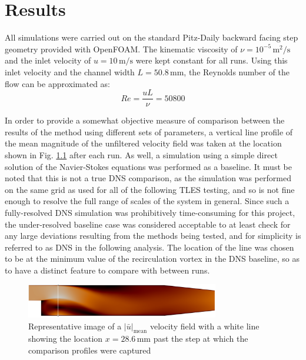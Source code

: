 \chapter{Results}


All simulations were carried out on the standard Pitz-Daily backward facing step geometry provided with OpenFOAM. The kinematic viscosity of $\nu=10^{-5}\,\mathrm{m}^2/\mathrm{s}$ and the inlet velocity of $u=10\,\mathrm{m}/\mathrm{s}$ were kept constant for all runs. Using this inlet velocity and the channel width $L=50.8\,\mathrm{mm}$, the Reynolds number of the flow can be approximated as: $$ Re=\frac{uL}{\nu}=50800$$

In order to provide a somewhat objective measure of comparison between the results of the method using different sets of parameters, a vertical line profile of the mean magnitude of the unfiltered velocity field was taken at the location shown in Fig. \ref{fig:line_location} after each run. As well, a simulation using a simple direct solution of the Navier-Stokes equations was performed as a baseline. It must be noted that this is not a true DNS comparison, as the simulation was performed on the same grid as used for all of the following TLES testing, and so is not fine enough to resolve the full range of scales of the system in general. Since such a fully-resolved DNS simulation was prohibitively time-consuming for this project, the under-resolved baseline case was considered acceptable to at least check for any large deviations resulting from the methods being tested, and for simplicity is referred to as DNS in the following analysis. The location of the line was chosen to be at the minimum value of the recirculation vortex in the DNS baseline, so as to have a distinct feature to compare with between runs.

\begin{figure}[!b]
\centering
\includegraphics[width=0.75\textwidth]{figures/line_location.pdf}
\caption{Representative image of a $|\bar{u}|_{\mathrm{mean}}$ velocity field with a white line showing the location $x=28.6\,\mathrm{mm}$ past the step at which the comparison profiles were captured}
\label{fig:line_location}
\end{figure}

